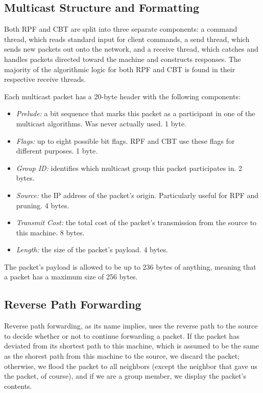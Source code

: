 \documentclass[11pt]{article}
\begin{document}
    \subsection{Multicast Structure and Formatting}
      Both RPF and CBT are split into three separate components: a command thread, which reads standard input for client commands, a send thread, which sends new packets out onto the network, and a receive thread, which catches and handles packets directed toward the machine and constructs responses. The majority of the algorithmic logic for both RPF and CBT is found in their respective receive threads.
      
      Each multicast packet has a 20-byte header with the following components:
      \begin{itemize}
        \item \emph{Prelude:} a bit sequence that marks this packet as a participant in one of the multicast algorithms. Was never actually used. 1 byte.
        \item \emph{Flags:} up to eight possible bit flags. RPF and CBT use these flags for different purposes. 1 byte.
        \item \emph{Group ID:} identifies which multicast group this packet participates in. 2 bytes.
        \item \emph{Source:} the IP address of the packet's origin. Particularly useful for RPF and pruning. 4 bytes.
        \item \emph{Transmit Cost:} the total cost of the packet's transmission from the source to this machine. 8 bytes.
        \item \emph{Length:} the size of the packet's payload. 4 bytes.
      \end{itemize} 
      The packet's payload is allowed to be up to 236 bytes of anything, meaning that a packet has a maximum size of 256 bytes.
    
    \subsection{Reverse Path Forwarding}
      Reverse path forwarding, as its name implies, uses the reverse path to the source to decide whether or not to continue forwarding a packet. If the packet has deviated from its shortest path to this machine, which is assumed to be the same as the shorest path from this machine to the source, we discard the packet; otherwise, we flood the packet to all neighbors (except the neighbor that gave us the packet, of course), and if we are a group member, we display the packet's contents.
      
\end{document}
